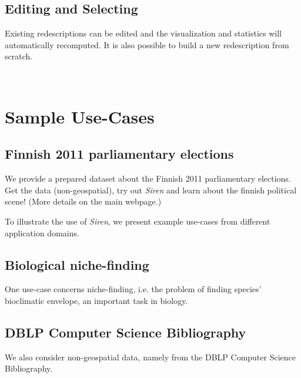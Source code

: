 \documentclass[letterpaper,10pt,english]{sphinxhowto}
\begin{document}
\subsection{Editing and Selecting}
\label{functionalities:editing-and-selecting}\label{functionalities:func-edit}
Existing redescriptions can be edited and the visualization and statistics will automatically recomputed.
It is also possible to build a new redescription from scratch.

\vfill
~
\newpage
~
\vfill

\section{Sample Use-Cases}
\label{use_cases:sample-use-cases}\label{use_cases:usecase}\label{use_cases::doc}

\subsection{Finnish 2011 parliamentary elections}
\label{use_cases:finnish-2011-parliamentary-elections}\label{use_cases:uc-finnelec}
We provide a prepared dataset about the Finnish 2011 parliamentary elections. Get the data (non-geospatial), try out \emph{Siren} and learn about the finnish political scene! (More details on the main webpage.)

To illustrate the use of \emph{Siren}, we present example use-cases from different application domains.


\subsection{Biological niche-finding}
\label{use_cases:biological-niche-finding}\label{use_cases:uc-bio}
One use-case concerns niche-finding, i.e. the problem of finding species' bioclimatic envelope, an important task in biology.

\subsection{DBLP Computer Science Bibliography}
\label{use_cases:dblp-computer-science-bibliography}\label{use_cases:uc-dblp}
We also consider non-geospatial data, namely from the DBLP Computer Science Bibliography.

\bigskip{}
\end{document}
